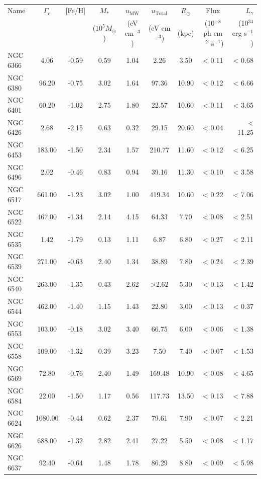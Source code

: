 \documentclass[doublespace,nopageskip]{VTthesis} %
\begin{document}
\begin{appendices}
\begin{table}
\centering
\begin{tabular}{lcccccccr}
\hline
Name &  $\Gamma_c$& [Fe/H]  & $M_*$ & $u_\text{MW}$ & $u_\text{Total}$ & $R_\odot$ & Flux & $L_\gamma$ \\
 & &  & ($10^5 M_\odot$) & (eV cm$^{-3}$) & (eV cm$^{-3}$) & (kpc) & (10$^{-8}$ ph cm$^{-2}$ s$^{-1}$)  & (10$^{34}$ erg s$^{-1}$)\\
\hline
NGC 6366 & 4.06 & -0.59 & 0.59 & 1.04 & 2.26 & 3.50 & < 0.11 & < 0.68\\
NGC 6380 & 96.20 & -0.75 & 3.02 & 1.64 & 97.36 & 10.90 & < 0.12 & < 6.66\\
NGC 6401 & 60.20 & -1.02 & 2.75 & 1.80 & 22.57 & 10.60 & < 0.11 & < 3.65\\
NGC 6426 & 2.68 & -2.15 & 0.63 & 0.32 & 29.15 & 20.60 & < 0.04 & < 11.25\\
NGC 6453 & 183.00 & -1.50 & 2.34 & 1.57 & 210.77 & 11.60 & < 0.12 & < 6.25\\
NGC 6496 & 2.02 & -0.46 & 0.83 & 0.94 & 39.16 & 11.30 & < 0.10 & < 3.58\\
NGC 6517 & 661.00 & -1.23 & 3.02 & 1.00 & 419.34 & 10.60 & < 0.22 & < 7.06\\
NGC 6522 & 467.00 & -1.34 & 2.14 & 4.15 & 64.33 & 7.70 & < 0.08 & < 2.51\\
NGC 6535 & 1.42 & -1.79 & 0.13 & 1.11 & 6.87 & 6.80 & < 0.27 & < 2.11\\
NGC 6539 & 271.00 & -0.63 & 2.40 & 1.34 & 38.89 & 7.80 & < 0.24 & < 2.39\\
NGC 6540 & 263.00 & -1.35 & 0.43 & 2.62 & >2.62 & 5.30 & < 0.13 & < 1.42\\
NGC 6544 & 462.00 & -1.40 & 1.15 & 1.43 & 22.80 & 3.00 & < 0.13 & < 0.37\\
NGC 6553 & 103.00 & -0.18 & 3.02 & 3.40 & 66.75 & 6.00 & < 0.06 & < 1.38\\
NGC 6558 & 109.00 & -1.32 & 0.39 & 3.23 & 7.50 & 7.40 & < 0.07 & < 1.53\\
NGC 6569 & 72.80 & -0.76 & 2.40 & 1.49 & 169.48 & 10.90 & < 0.08 & < 4.65\\
NGC 6584 & 22.00 & -1.50 & 1.17 & 0.56 & 117.73 & 13.50 & < 0.13 & < 7.88\\
NGC 6624 & 1080.00 & -0.44 & 0.62 & 2.37 & 79.61 & 7.90 & < 0.07 & < 2.21\\
NGC 6626 & 688.00 & -1.32 & 2.82 & 2.41 & 27.22 & 5.50 & < 0.08 & < 1.17\\
NGC 6637 & 92.40 & -0.64 & 1.48 & 1.78 & 86.29 & 8.80 & < 0.09 & < 5.98\\

\end{tabular}
\end{table}
\end{appendices}
\end{document}
